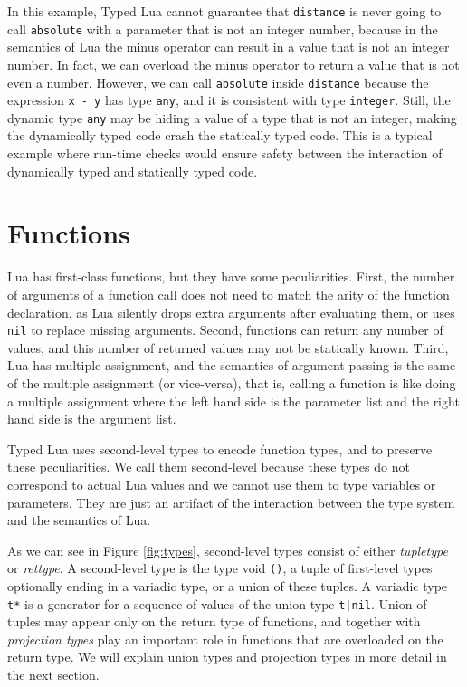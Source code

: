 In this example, Typed Lua cannot guarantee that \texttt{distance} is never
going to call \texttt{absolute} with a parameter that is not an integer number,
because in the semantics of Lua the minus operator can result in a
value that is not an integer number.
In fact, we can overload the minus operator to return a value that is
not even a number.
However, we can call \texttt{absolute} inside \texttt{distance}
because the expression \texttt{x - y} has type \texttt{any},
and it is consistent with type \texttt{integer}.
Still, the dynamic type \texttt{any} may be hiding a value of a type
that is not an integer, making the dynamically typed code crash the
statically typed code.
This is a typical example where run-time checks would ensure safety
between the interaction of dynamically typed and statically typed code.

\section{Functions}
\label{sec:functions}

Lua has first-class functions, but they have some peculiarities.
First, the number of arguments of a function call does
not need to match the arity of the function declaration, as Lua silently
drops extra arguments after evaluating them, or uses \texttt{nil} to
replace missing arguments.
Second, functions can return any number of values,
and this number of returned values may not be statically known.
Third, Lua has multiple assignment, and the semantics
of argument passing is the same of the multiple assignment
(or vice-versa), that is, calling a function is like doing a
multiple assignment where the left hand side is the parameter list
and the right hand side is the argument list.

Typed Lua uses second-level types to encode function types,
and to preserve these peculiarities.
We call them second-level because these types do not correspond
to actual Lua values and we cannot use them to type variables or
parameters.
They are just an artifact of the interaction between the type system
and the semantics of Lua.

As we can see in Figure \ref{fig:types}, second-level types consist
of either \emph{tupletype} or \emph{rettype}.
A second-level type is the type void \texttt{()},
a tuple of first-level types optionally ending in a variadic type,
or a union of these tuples.
A variadic type \texttt{t*} is a generator for a sequence of values
of the union type \texttt{t|nil}.
Union of tuples may appear only on the return type of functions,
and together with \emph{projection types} play an important role
in functions that are overloaded on the return type.
We will explain union types and projection types in more detail
in the next section.

